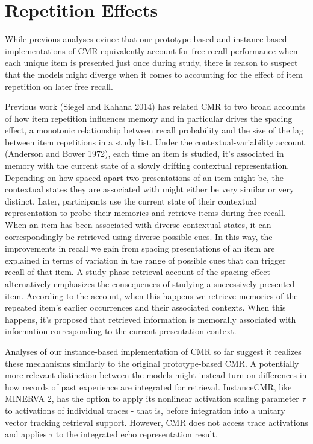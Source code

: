 \documentclass[
  letterpaper,
  DIV=11]{article}
\begin{document}
\hypertarget{repetition-effects}{%
\section{Repetition Effects}\label{repetition-effects}}

While previous analyses evince that our prototype-based and
instance-based implementations of CMR equivalently account for free
recall performance when each unique item is presented just once during
study, there is reason to suspect that the models might diverge when it
comes to accounting for the effect of item repetition on later free
recall.

Previous work (Siegel and Kahana 2014) has related CMR to two broad
accounts of how item repetition influences memory and in particular
drives the spacing effect, a monotonic relationship between recall
probability and the size of the lag between item repetitions in a study
list. Under the contextual-variability account (Anderson and Bower
1972), each time an item is studied, it's associated in memory with the
current state of a slowly drifting contextual representation. Depending
on how spaced apart two presentations of an item might be, the
contextual states they are associated with might either be very similar
or very distinct. Later, participants use the current state of their
contextual representation to probe their memories and retrieve items
during free recall. When an item has been associated with diverse
contextual states, it can correspondingly be retrieved using diverse
possible cues. In this way, the improvements in recall we gain from
spacing presentations of an item are explained in terms of variation in
the range of possible cues that can trigger recall of that item. A
study-phase retrieval account of the spacing effect alternatively
emphasizes the consequences of studying a successively presented item.
According to the account, when this happens we retrieve memories of the
repeated item's earlier occurrences and their associated contexts. When
this happens, it's proposed that retrieved information is memorally
associated with information corresponding to the current presentation
context.

Analyses of our instance-based implementation of CMR so far suggest it
realizes these mechanisms similarly to the original prototype-based CMR.
A potentially more relevant distinction between the models might instead
turn on differences in how records of past experience are integrated for
retrieval. InstanceCMR, like MINERVA 2, has the option to apply its
nonlinear activation scaling parameter \(\tau\) to activations of
individual traces - that is, before integration into a unitary vector
tracking retrieval support. However, CMR does not access trace
activations and applies \(\tau\) to the integrated echo representation
result.
\end{document}
